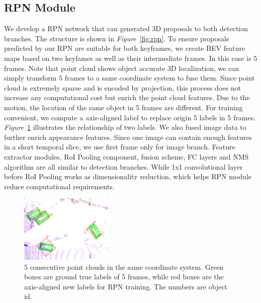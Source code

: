 \documentclass[letterpaper, 10 pt, conference]{ieeeconf}  %
\def\figurename{\emph{Figure}}
\begin{document}
\subsection{RPN Module}

We develop a RPN network that can generated 3D proposals to both detection branches. The structure is shown in \figurename \, \ref{fig:rpn}. To ensure proposals predicted by our RPN are suitable for both keyframes, we create BEV feature maps based on two keyfames as well as their intermediate frames. In this case is 5 frames. Note that point cloud shows object accurate 3D localization, we can simply transform 5 frames to a same coordinate system to fuse them. Since point cloud is extremely sparse and is encoded by projection, this process does not increase any computational cost but enrich the point cloud features. Due to the motion, the location of the same object in 5 frames are different. For training convenient, we compute a axis-aligned label to replace origin 5 labels in 5 frames. \figurename \, \ref{fig:integrated_boxes} illustrates the relationship of two labels. We also fused image data to further enrich appearance features. Since one image can contain enough features in a short temporal slice, we use first frame only for image branch. Feature extractor modules, RoI Pooling component, fusion scheme, FC layers and NMS algorithm are all similar to detection branches. While 1x1 convolutional layer before RoI Pooling works as dimensionality reduction, which helps RPN module reduce computational requirements.

\begin{figure}
	\vspace{-0.6cm}
	\rule{0pt}{1ex}
	\begin{center}
		\includegraphics[width=0.4\textwidth]{images/integrated_boxes.png}
	\end{center}
	\caption{5 consecutive point clouds in the same coordinate system. Green boxes are ground true labels of 5 frames, while red boxes are the axis-aligned new labels for RPN training. The numbers are object id.}
	\label{fig:integrated_boxes}
	\vspace{-0.5cm}
\end{figure}
\end{document}
